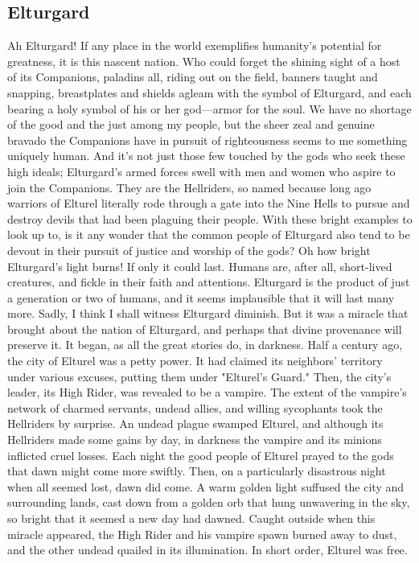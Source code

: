 \documentclass[10pt,a4paper,twoside,twocolumn,openany,bg=print,nodeprecatedcode]{dndbook}
\begin{document}
\subsection{Elturgard}
Ah Elturgard! If any place in the world exemplifies humanity's potential for greatness, it is this nascent nation. Who could forget the shining sight of a host of its Companions, paladins all, riding out on the field, banners taught and snapping, breastplates and shields agleam with the symbol of Elturgard, and each bearing a holy symbol of his or her god—armor for the soul. We have no shortage of the good and the just among my people, but the sheer zeal and genuine bravado the Companions have in pursuit of righteousness seems to me something uniquely human. And it's not just those few touched by the gods who seek these high ideals; Elturgard's armed forces swell with men and women who aspire to join the Companions. They are the Hellriders, so named because long ago warriors of Elturel literally rode through a gate into the Nine Hells to pursue and destroy devils that had been plaguing their people. With these bright examples to look up to, is it any wonder that the common people of Elturgard also tend to be devout in their pursuit of justice and worship of the gods?
Oh how bright Elturgard's light burns! If only it could last. Humans are, after all, short-lived creatures, and fickle in their faith and attentions. Elturgard is the product of just a generation or two of humans, and it seems implausible that it will last many more. Sadly, I think I shall witness Elturgard diminish. But it was a miracle that brought about the nation of Elturgard, and perhaps that divine provenance will preserve it.
It began, as all the great stories do, in darkness. Half a century ago, the city of Elturel was a petty power. It had claimed its neighbors' territory under various excuses, putting them under "Elturel's Guard." Then, the city's leader, its High Rider, was revealed to be a vampire. The extent of the vampire's network of charmed servants, undead allies, and willing sycophants took the Hellriders by surprise. An undead plague swamped Elturel, and although its Hellriders made some gains by day, in darkness the vampire and its minions inflicted cruel losses. Each night the good people of Elturel prayed to the gods that dawn might come more swiftly.
Then, on a particularly disastrous night when all seemed lost, dawn did come. A warm golden light suffused the city and surrounding lands, cast down from a golden orb that hung unwavering in the sky, so bright that it seemed a new day had dawned. Caught outside when this miracle appeared, the High Rider and his vampire spawn burned away to dust, and the other undead quailed in its illumination. In short order, Elturel was free.
\end{document}
